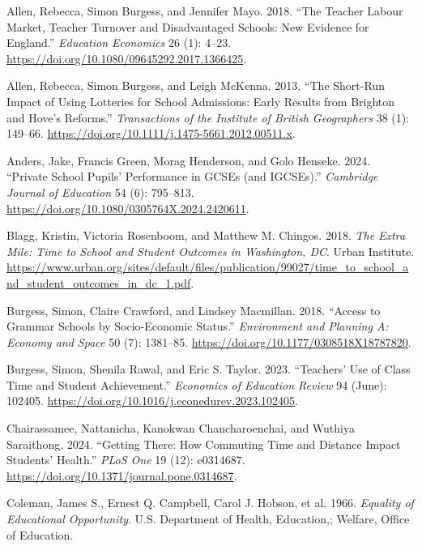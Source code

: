 \documentclass[
  12pt,
  titlepage]{article}
\newlength{\cslhangindent}
\newenvironment{CSLReferences}[2] %
 {\begin{list}{}{%
  \setlength{\itemindent}{0pt}
  \setlength{\leftmargin}{0pt}
  \setlength{\parsep}{0pt}
  \ifodd #1
   \setlength{\leftmargin}{\cslhangindent}
   \setlength{\itemindent}{-1\cslhangindent}
  \fi
  \setlength{\itemsep}{#2\baselineskip}}}
 {\end{list}}
\begin{document}
\label{refs}
\begin{CSLReferences}{1}{1}
Allen, Rebecca, Simon Burgess, and Jennifer Mayo. 2018. {``The Teacher
Labour Market, Teacher Turnover and Disadvantaged Schools: New Evidence
for {England}.''} \emph{Education Economics} 26 (1): 4--23.
\url{https://doi.org/10.1080/09645292.2017.1366425}.

Allen, Rebecca, Simon Burgess, and Leigh McKenna. 2013. {``The Short-Run
Impact of Using Lotteries for School Admissions: Early Results from
{Brighton} and {Hove}'s Reforms.''} \emph{Transactions of the Institute
of British Geographers} 38 (1): 149--66.
\url{https://doi.org/10.1111/j.1475-5661.2012.00511.x}.

Anders, Jake, Francis Green, Morag Henderson, and Golo Henseke. 2024.
{``Private School Pupils' Performance in {GCSEs} (and {IGCSEs}).''}
\emph{Cambridge Journal of Education} 54 (6): 795--813.
\url{https://doi.org/10.1080/0305764X.2024.2420611}.

Blagg, Kristin, Victoria Rosenboom, and Matthew M. Chingos. 2018.
\emph{The {Extra} {Mile}: {Time} to {School} and {Student} {Outcomes} in
{Washington}, {DC}}. Urban Institute.
\url{https://www.urban.org/sites/default/files/publication/99027/time_to_school_and_student_outcomes_in_dc_1.pdf}.

Burgess, Simon, Claire Crawford, and Lindsey Macmillan. 2018. {``Access
to Grammar Schools by Socio-Economic Status.''} \emph{Environment and
Planning A: Economy and Space} 50 (7): 1381--85.
\url{https://doi.org/10.1177/0308518X18787820}.

Burgess, Simon, Shenila Rawal, and Eric S. Taylor. 2023. {``Teachers'
Use of Class Time and Student Achievement.''} \emph{Economics of
Education Review} 94 (June): 102405.
\url{https://doi.org/10.1016/j.econedurev.2023.102405}.

Chairassamee, Nattanicha, Kanokwan Chancharoenchai, and Wuthiya
Saraithong. 2024. {``Getting There: How Commuting Time and Distance
Impact Students' Health.''} \emph{PLoS One} 19 (12): e0314687.
\url{https://doi.org/10.1371/journal.pone.0314687}.

Coleman, James S., Ernest Q. Campbell, Carol J. Hobson, et al. 1966.
\emph{Equality of {Educational} {Opportunity}}. U.S. Department of
Health, Education,; Welfare, Office of Education.


\end{CSLReferences}
\end{document}
